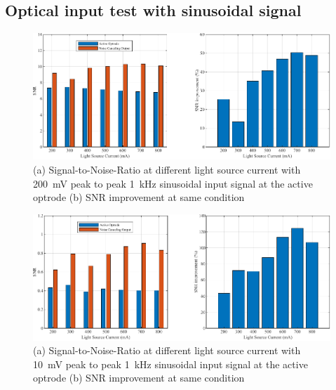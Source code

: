 \subsection{Optical input test with sinusoidal signal}

\begin{figure}[htbp]
\centerline{\includegraphics[scale=1]{5-Experiment/SNR (200mV input).pdf}}
\caption{(a) Signal-to-Noise-Ratio at different light source current with \qty{200}{\mV} peak to peak \qty{1}{\kHz} sinusoidal input signal at the active optrode (b) SNR improvement at same condition}
\label{fig_SNR (200mV input)}
\end{figure}

\begin{figure}[htbp]
\centerline{\includegraphics[scale=1]{5-Experiment/SNR (10mV input).pdf}}
\caption{(a) Signal-to-Noise-Ratio at different light source current with \qty{10}{\mV} peak to peak \qty{1}{\kHz} sinusoidal input signal at the active optrode (b) SNR improvement at same condition}
\label{fig_SNR (10mV input)}
\end{figure}

